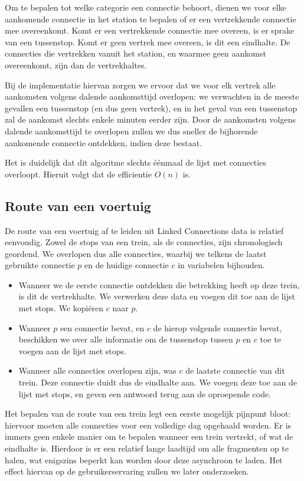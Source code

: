Om te bepalen tot welke categorie een connectie behoort, dienen we voor elke aankomende connectie in het station te bepalen of er een vertrekkende connectie mee overeenkomt. Komt er een vertrekkende connectie mee overeen, is er sprake van een tussenstop. Komt er geen vertrek mee overeen, is dit een eindhalte. De connecties die vertrekken vanuit het station, en waarmee geen aankomst overeenkomt, zijn dan de vertrekhaltes. 

Bij de implementatie hiervan zorgen we ervoor dat we voor elk vertrek alle aankomsten volgens dalende aankomsttijd overlopen: we verwachten in de meeste gevallen een tussenstop (en dus geen vertrek), en in het geval van een tussenstop zal de aankomst slechts enkele minuten eerder zijn. Door de aankomsten volgens dalende aankomsttijd te overlopen zullen we dus sneller de bijhorende aankomende connectie ontdekken, indien deze bestaat.

Het is duidelijk dat dit algoritme slechts éénmaal de lijst met connecties overloopt. Hieruit volgt dat de efficientie $O(n)$ is.

\subsection{Route van een voertuig}

De route van een voertuig af te leiden uit Linked Connections data is relatief eenvoudig. Zowel de stops van een trein, als de connecties, zijn chronologisch geordend. We overlopen dus alle connecties, waarbij we telkens de laatst gebruikte connectie $p$ en de huidige connectie $c$ in variabelen bijhouden. 
\begin{itemize}
	\item Wanneer we de eerste connectie ontdekken die betrekking heeft op deze trein, is dit de vertrekhalte. We verwerken deze data en voegen dit toe aan de lijst met stops. We kopiëren $c$ naar $p$.
	\item Wanneer $p$ een connectie bevat, en $c$ de hierop volgende connectie bevat, beschikken we over alle informatie om de tussenstop tussen $p$ en $c$ toe te voegen aan de lijst met stops.
	\item Wanneer alle connecties overlopen zijn, was $c$ de laatste connectie van dit trein. Deze connectie duidt dus de eindhalte aan. We voegen deze toe aan de lijst met stops, en geven een antwoord terug aan de oproepende code.
\end{itemize}

Het bepalen van de route van een trein legt een eerste mogelijk pijnpunt bloot: hiervoor moeten alle connecties voor een volledige dag opgehaald worden. Er is immers geen enkele manier om te bepalen wanneer een trein vertrekt, of wat de eindhalte is. Hierdoor is er een relatief lange laadtijd om alle fragmenten op te halen, wat enigszins beperkt kan worden door deze asynchroon te laden. Het effect hiervan op de gebruikerservaring zullen we later onderzoeken. 

